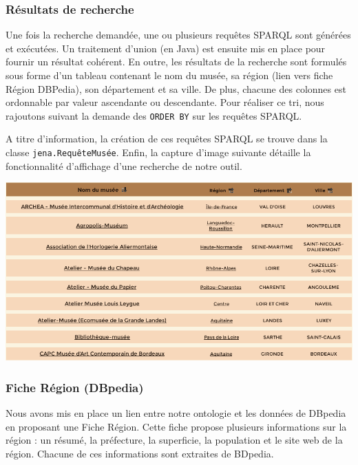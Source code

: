 \documentclass{article}
\begin{document}
\subsubsection{Résultats de recherche}

Une fois la recherche demandée, une ou plusieurs requêtes SPARQL sont générées
et exécutées. Un traitement d'union (en Java) est ensuite mis en place pour
fournir un résultat cohérent. En outre, les résultats de la recherche sont
formulés sous forme d'un tableau contenant le nom du musée, sa région 
(lien vers fiche Région DBPedia), son département et sa ville. De plus, chacune des colonnes est
ordonnable par valeur ascendante ou descendante. Pour réaliser ce tri, nous
rajoutons suivant la demande des \texttt{ORDER BY} sur les requêtes SPARQL.

A titre d'information, la création de ces requêtes SPARQL se trouve dans la
classe \texttt{jena.RequêteMusée}. Enfin, la capture d'image suivante détaille
la fonctionnalité d'affichage d'une recherche de notre outil.
\begin{center}
\includegraphics[width=14cm]{trouveMuseeResultat.png}
\end{center}


\subsubsection{Fiche Région (DBpedia)}

Nous avons mis en place un lien entre notre ontologie et les données de DBpedia
en proposant une Fiche Région. Cette fiche propose plusieurs informations sur la
région : un résumé, la préfecture, la superficie, la population et le site web
de la région. Chacune de ces informations sont extraites de BDpedia.

\vspace{0.3cm}
\end{document}
